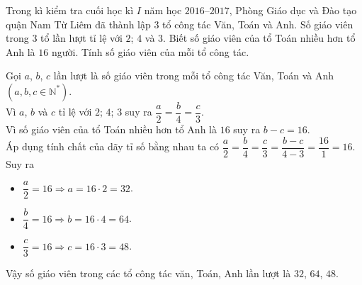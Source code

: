 		\begin{ex}%
			Trong kì kiểm tra cuối học kì $I$ năm học $2016 – 2017$, Phòng Giáo dục và Đào tạo quận Nam Từ Liêm đã thành lập $3$ tổ công tác Văn, Toán và Anh. Số giáo viên trong $3$ tổ lần lượt tỉ lệ với $2$; $4$ và $3$. Biết số giáo viên của tổ Toán nhiều hơn tổ Anh là $16$ người. Tính số giáo viên của mỗi tổ công tác.
			\loigiai
			{
			Gọi $a$, $b$, $c$ lần lượt là số giáo viên trong mỗi tổ công tác Văn, Toán và Anh $(a, b, c \in \mathbb{N^*})$.\\
			Vì $a$, $b$ và $c$ tỉ lệ với $2$; $4$; $3$ suy ra $\dfrac{a}{2} = \dfrac{b}{4} = \dfrac{c}{3}$.\\
			Vì số giáo viên của tổ Toán nhiều hơn tổ Anh là $16$ suy ra $b - c = 16$.\\
			Áp dụng tính chất của dãy tỉ số bằng nhau ta có
			$\dfrac{a}{2} = \dfrac{b}{4} = \dfrac{c}{3} = \dfrac{b-c}{4-3} = \dfrac{16}{1} = 16.$\\
			Suy ra \begin{itemize}
				\item $\dfrac{a}{2} = 16 \Rightarrow a = 16\cdot 2 = 32$.
				\item $\dfrac{b}{4} = 16 \Rightarrow b = 16\cdot 4 = 64$.
			\item $\dfrac{c}{3} = 16 \Rightarrow c = 16\cdot 3 = 48$.
				\end{itemize}
			Vậy số giáo viên trong các tổ công tác văn, Toán, Anh lần lượt là $32$, $64$, $48$.
			}
		\end{ex}
	
